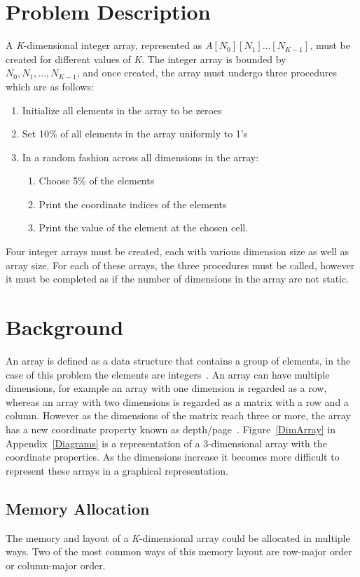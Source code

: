 \documentclass[10pt, conference]{IEEEtran}
\begin{document}
\section{Problem Description}
\label{Problem Description}
A \emph{K}-dimensional integer array, represented as $A[N_0][N_1]...[N_{K-1}]$, must be created for different values of \emph{K}. The integer array is bounded by $N_0, N_1,...,N_{K-1}$, and once created, the array must undergo three procedures which are as follows:
\begin{enumerate}
\item Initialize all elements in the array to be zeroes
\item Set 10\% of all elements in the array uniformly to 1's
\item In a random fashion across all dimensions in the array:
	\begin{enumerate}
	\item Choose 5\% of the elements
	\item Print the coordinate indices of the elements
	\item Print the value of the element at the chosen cell.
	\end{enumerate}
\end{enumerate}

Four integer arrays must be created, each with various dimension size as well as array size. For each of these arrays, the three procedures must be called, however it must be completed as if the number of dimensions in the array are not static.

\section{Background}
\label{Background}
An array is defined as a data structure that contains a group of elements, in the case of this problem the elements are integers~\cite{Array Def}. An array can have multiple dimensions, for example an array with one dimension is regarded as a row, whereas an array with two dimensions is regarded as a matrix with a row and a column. However as the dimensions of the matrix reach three or more, the array has a new coordinate property known as depth/page~\cite{Eli, Mathworks}. Figure~\ref{DimArray} in Appendix~\ref{Diagrams} is a representation of a 3-dimensional array with the coordinate properties. As the dimensions increase it becomes more difficult to represent these arrays in a graphical representation.


\subsection{Memory Allocation}
\label{Memory Allocation}
The memory and layout of a \emph{K}-dimensional array could be allocated in multiple ways. Two of the most common ways of this memory layout are row-major order or column-major order. 
\end{document}
